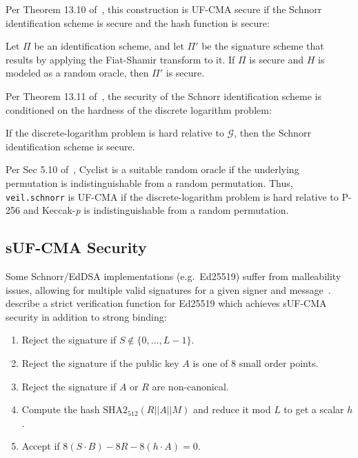 Per Theorem 13.10 of~\textcite[p. 478]{katz2020}, this construction is UF-CMA secure if the Schnorr identification
scheme is secure and the hash function is secure:

\begin{displayquote}
    Let $\Pi$ be an identification scheme, and let $\Pi'$ be the signature scheme that results by applying the
    Fiat-Shamir transform to it.
    If $\Pi$ is secure and $H$ is modeled as a random oracle, then $\Pi'$ is secure.
\end{displayquote}

Per Theorem 13.11 of~\textcite[p. 481]{katz2020}, the security of the Schnorr identification scheme is conditioned on
the hardness of the discrete logarithm problem:

\begin{displayquote}
    If the discrete-logarithm problem is hard relative to $\mathcal{G}$, then the Schnorr identification scheme is
    secure.
\end{displayquote}

Per Sec 5.10 of~\textcite{bertoni2011sponge}, Cyclist is a suitable random oracle if the underlying permutation is
indistinguishable from a random permutation.
Thus, \texttt{veil.schnorr} is UF-CMA if the discrete-logarithm problem is hard relative to P-256 and Keccak-\emph{p} is
indistinguishable from a random permutation.

\subsection{sUF-CMA Security}\label{subsec:veil.schnorr-suf-cma}

Some Schnorr/EdDSA implementations (e.g.\ Ed25519) suffer from malleability issues, allowing for multiple valid
signatures for a given signer and message~\cite{brendel2021}.
\textcite{chalkias2020} describe a strict verification function for Ed25519 which achieves sUF-CMA security in addition
to strong binding:

\begin{displayquote}
    \begin{enumerate}
        \item Reject the signature if $S \not\in \{0,\ldots,L-1\}$.
        \item Reject the signature if the public key $A$ is one of 8 small order points.
        \item Reject the signature if $A$ or $R$ are non-canonical.
        \item Compute the hash $\text{SHA2}_{512}(R||A||M)$ and reduce it mod $L$ to get a scalar $h$.
        \item Accept if $8(S \cdot B)-8R-8(h \cdot A)=0$.
    \end{enumerate}
\end{displayquote}

